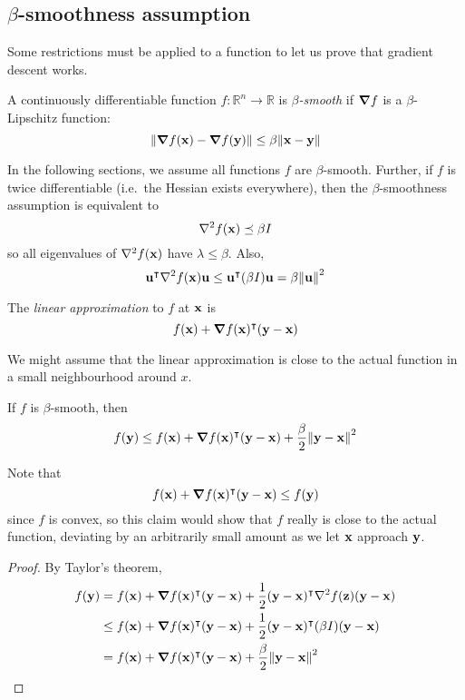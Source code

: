 \subsection{\(\beta\)-smoothness assumption}
Some restrictions must be applied to a function to let us prove that gradient descent works.
\begin{definition}
	A continuously differentiable function \(f \colon \mathbb R^n \to \mathbb R\) is \textit{\(\beta\)-smooth} if \(\grad{f}\) is a \(\beta\)-Lipschitz function:
	\[
		\norm{\grad{f(\vb x) - \grad{f(\vb y)}}} \leq \beta \norm{\vb x - \vb y}
	\]
\end{definition}
\noindent In the following sections, we assume all functions \(f\) are \(\beta\)-smooth.
Further, if \(f\) is twice differentiable (i.e.\ the Hessian exists everywhere), then the \(\beta\)-smoothness assumption is equivalent to
\[
	\laplacian{f(\vb x)} \preceq \beta I
\]
so all eigenvalues of \(\laplacian{f(\vb x)}\) have \(\lambda \leq \beta\).
Also,
\[
	\vb u^\transpose \laplacian{f(\vb x)} \vb u \leq \vb u^\transpose (\beta I) \vb u = \beta \norm{\vb u}^2
\]
\begin{definition}
	The \textit{linear approximation} to \(f\) at \(\vb x\) is
	\[
		f(\vb x) + \grad{f(\vb x)}^\intercal (\vb y - \vb x)
	\]
\end{definition}
\noindent We might assume that the linear approximation is close to the actual function in a small neighbourhood around \(x\).
\begin{claim}
	If \(f\) is \(\beta\)-smooth, then
	\[
		f(\vb y) \leq f(\vb x) + \grad{f(\vb x)}^\intercal (\vb y - \vb x) + \frac{\beta}{2}\norm{\vb y - \vb x}^2
	\]
\end{claim}
\noindent Note that
\[
	f(\vb x) + \grad{f(\vb x)}^\intercal (\vb y - \vb x) \leq f(\vb y)
\]
since \(f\) is convex, so this claim would show that \(f\) really is close to the actual function, deviating by an arbitrarily small amount as we let \(\vb x\) approach \(\vb y\).
\begin{proof}
	By Taylor's theorem,
	\begin{align*}
		f(\vb y) & = f(\vb x) + \grad{f(\vb x)}^\transpose (\vb y - \vb x) + \frac{1}{2}(\vb y - \vb x)^\transpose \laplacian{f(\vb z)}(\vb y - \vb x) \\
		         & \leq f(\vb x) + \grad{f(\vb x)}^\transpose (\vb y - \vb x) + \frac{1}{2}(\vb y - \vb x)^\transpose (\beta I) (\vb y - \vb x)        \\
		         & = f(\vb x) + \grad{f(\vb x)}^\transpose (\vb y - \vb x) + \frac{\beta}{2}\norm{\vb y - \vb x}^2                                     \\
	\end{align*}
\end{proof}
